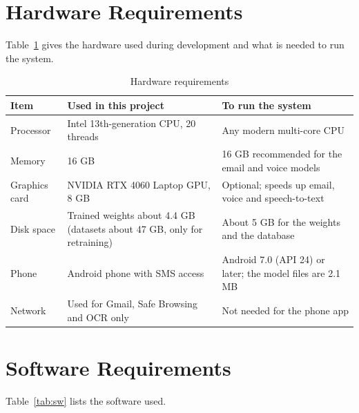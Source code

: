 {\section{Hardware Requirements}
Table~\ref{tab:hw} gives the hardware used during development and what is needed to run the system.

\begin{table}[H]
\caption{Hardware requirements}
\label{tab:hw}
\centering\small{}
\begin{tabular}{|p{3.3cm}|p{5.7cm}|p{5.2cm}|}
\hline
\textbf{Item} & \textbf{Used in this project} & \textbf{To run the system} \\ \hline
Processor & Intel 13th-generation CPU, 20 threads & Any modern multi-core CPU \\ \hline
Memory & 16 GB & 16 GB recommended for the email and voice models \\ \hline
Graphics card & NVIDIA RTX 4060 Laptop GPU, 8 GB & Optional; speeds up email, voice and speech-to-text \\ \hline
Disk space & Trained weights about 4.4 GB (datasets about 47 GB, only for retraining) & About 5 GB for the weights and the database \\ \hline
Phone & Android phone with SMS access & Android 7.0 (API 24) or later; the model files are 2.1 MB \\ \hline
Network & Used for Gmail, Safe Browsing and OCR only & Not needed for the phone app \\ \hline
\end{tabular}
\end{table}

\section{Software Requirements}\label{sec:sw}
Table~\ref{tab:sw} lists the software used.

}
